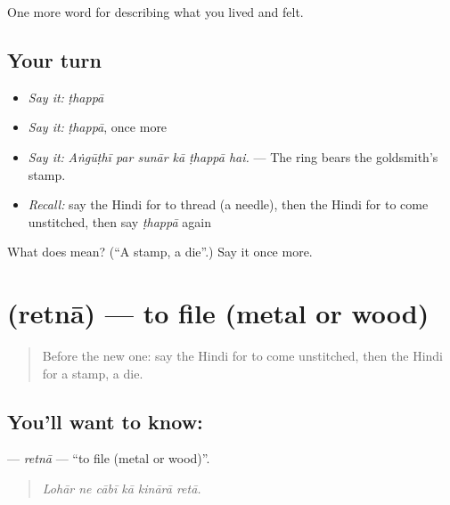 \begin{grammarlens}[title={What you've built}]
One more word for describing what you lived and felt.
\end{grammarlens}

\subsection*{Your turn}
\begin{itemize}
\raggedright
  \item \emph{Say it:} \emph{ṭhappā}
  \item \emph{Say it:} \emph{ṭhappā}, once more
  \item \emph{Say it:} \emph{Aṅgūṭhī par sunār kā ṭhappā hai.} — The ring bears the goldsmith's stamp.
  \item \emph{Recall:} say the Hindi for to thread (a needle), then the Hindi for to come unstitched, then say \emph{ṭhappā} again
\end{itemize}

\begin{tcolorbox}[breakable,colback=teal!4,colframe=teal!35!black,title={Before you move on}]
What does  mean? (\textquotedblleft{}A stamp, a die\textquotedblright{}.) Say it once more.
\end{tcolorbox}
\section[\texorpdfstring{\hi{रेतना} (retnā)}{रेतना (retnā)}]{ (retnā) — to file (metal or wood)}

\label{lesson:HI-C514-retna}



\begin{quote}
Before the new one: say the Hindi for to come unstitched, then the Hindi for a stamp, a die.
\end{quote}

\subsection*{You'll want to know: }
\textbf{} — \emph{retnā} — \textquotedblleft{}to file (metal or wood)\textquotedblright{}.

\begin{quote}
     
\end{quote}

\begin{quote}
\emph{Lohār ne cābī kā kinārā retā.}
\end{quote}

